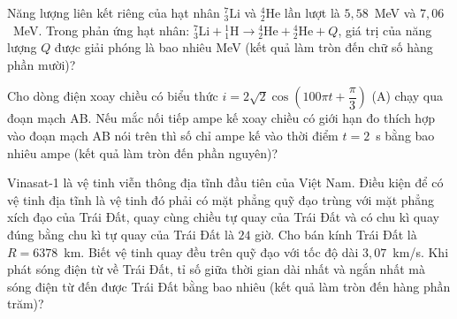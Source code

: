 	\begin{ex}%
		Năng lượng liên kết riêng của hạt nhân ${}^7_3\text{Li}$ và ${}^4_2\text{He}$ lần lượt là $5{,}58$~MeV và $7{,}06$~MeV. Trong phản ứng hạt nhân: ${}^7_3\text{Li}+{}^1_1\text{H}\to{}^4_2\text{He}+{}^4_2\text{He}+Q$, giá trị của năng lượng $Q$ được giải phóng là bao nhiêu MeV (kết quả làm tròn đến chữ số hàng phần mười)?
		\par
	\end{ex}

	\begin{ex}%
		Cho dòng điện xoay chiều có biểu thức $i=2\sqrt{2}\cos\left(100\pi t+\dfrac{\pi}{3}\right)$ (A) chạy qua đoạn mạch AB. Nếu mắc nối tiếp ampe kế xoay chiều có giới hạn đo thích hợp vào đoạn mạch AB nói trên thì số chỉ ampe kế vào thời điểm $t=2$~s bằng bao nhiêu ampe (kết quả làm tròn đến phần nguyên)?
		\par
	\end{ex}

	\begin{ex}%
		Vinasat-1 là vệ tinh viễn thông địa tĩnh đầu tiên của Việt Nam. Điều kiện để có vệ tinh địa tĩnh là vệ tinh đó phải có mặt phẳng quỹ đạo trùng với mặt phẳng xích đạo của Trái Đất, quay cùng chiều tự quay của Trái Đất và có chu kì quay đúng bằng chu kì tự quay của Trái Đất là $24$ giờ. Cho bán kính Trái Đất là $R=6378$~km. Biết vệ tinh quay đều trên quỹ đạo với tốc độ dài $3{,}07$~km/s. Khi phát sóng điện từ về Trái Đất, tỉ số giữa thời gian dài nhất và ngắn nhất mà sóng điện từ đến được Trái Đất bằng bao nhiêu (kết quả làm tròn đến hàng phần trăm)?
		\par
	\end{ex}

